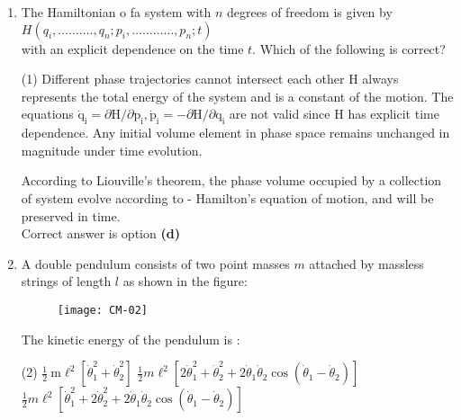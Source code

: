 \begin{enumerate}
\begin{answer}
		The expression in bracket is just the total time derivative of $\lambda(\vec{x}, t)$.\\
		If we add a total time derivative of a function of $\overrightarrow{\mathrm{x}}$ and $\mathrm{t}$ to the Lagrangian, the equations of motion do not change.\\
		Correct answer is option \textbf{(d)}
	\end{answer}
	\item The Hamiltonian o fa system with $n$ degrees of freedom is given by \\$H\left(q_{i}, \ldots \ldots \ldots ., q_{n} ; p_{i}, \ldots \ldots \ldots \ldots, p_{n} ; t\right)$\\
	with an explicit dependence on the time $t$. Which of the following is correct?
	 \begin{tasks}(1)
		\task[\textbf{a.}]Different phase trajectories cannot intersect each other
		\task[\textbf{b.}]H always represents the total energy of the system and is a constant of the motion.
		\task[\textbf{c.}]The equations $\dot{\mathrm{q}}_{\mathrm{i}}=\partial \mathrm{H} / \partial \mathrm{p}_{\mathrm{i}}, \dot{\mathrm{p}}_{\mathrm{i}}=-\partial \mathrm{H} / \partial \mathrm{q}_{\mathrm{i}}$ are not valid since H has explicit time dependence.
		\task[\textbf{d.}] Any initial volume element in phase space remains unchanged in magnitude under time evolution.
	\end{tasks}
\begin{answer}
	According to Liouville's theorem, the phase volume occupied by a collection of system evolve according to - Hamilton's equation of motion, and will be preserved in time.\\
	Correct answer is option \textbf{(d)}
\end{answer}
	\item A double pendulum consists of two point masses $m$ attached by massless strings of length $l$ as shown in the figure:
	\begin{figure}[H]
		\centering
		\texttt{[image: CM-02]}
	\end{figure}
	The kinetic energy of the pendulum is :
	 \begin{tasks}(2)
		\task[\textbf{a.}]$\frac{1}{2} \mathrm{~m} \ell^{2}\left[\dot{\theta}_{1}^{2}+\dot{\theta}_{2}^{2}\right]$
		\task[\textbf{b.}]$\frac{1}{2} m \ell^{2}\left[2 \dot{\theta}_{1}^{2}+\dot{\theta}_{2}^{2}+2 \dot{\theta}_{1} \dot{\theta}_{2} \cos \left(\dot{\theta}_{1}-\dot{\theta}_{2}\right)\right]$
		\task[\textbf{c.}]$\frac{1}{2} m \ell^{2}\left[\dot{\theta}_{1}^{2}+2 \dot{\theta}_{2}^{2}+2 \dot{\theta}_{1} \dot{\theta}_{2} \cos \left(\dot{\theta}_{1}-\dot{\theta}_{2}\right)\right]$

\end{tasks}
\end{enumerate}
